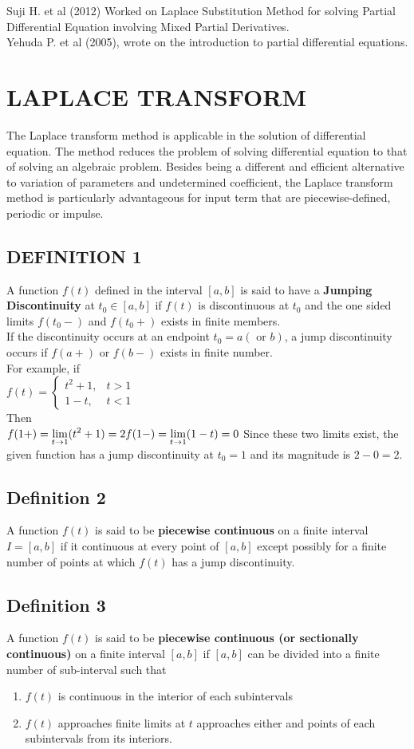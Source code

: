 \documentclass[11pt]{report}
\newcommand{\ft}{f(t)}
\newcommand{\sps}{\\[0.2cm]}
\newcommand{\bt}[1]{\textbf{#1}}
\newcommand{\dsp}{\displaystyle}
\begin{document}
	Suji H. et al (2012) Worked on Laplace Substitution Method for solving Partial Differential Equation involving Mixed Partial Derivatives.\\
	
	Yehuda P. et al (2005), wrote on the introduction to partial differential equations.    
	
	
	\section{LAPLACE TRANSFORM}
	The Laplace transform method is applicable in the solution of differential equation. The method reduces the problem of solving differential equation to that of solving an algebraic problem.  Besides being a different and efficient alternative to variation of parameters and undetermined coefficient, the Laplace transform method is particularly advantageous for input term that are piecewise-defined, periodic or impulse.
	
	\subsection{DEFINITION 1}
	A function $\ft$ defined in the interval $[a,b]$ is said to have a \bt{Jumping Discontinuity} at $t_0\in [a,b]$ if $\ft$ is discontinuous at $t_0$ and the one sided limits $f(t_0-)$ and $f(t_0+)$ exists in finite members.\sps
	If the discontinuity occurs at an endpoint $t_0=a(\text{ or } b)$, a jump discontinuity occurs if $f(a+)$ or $f(b-)$ exists in finite number.\sps
	For example, if\\
	$\dsp f(t) = \left\{ \begin{array}{lr}
		t^2 + 1, & t>1\\
		1-t, & t<1
	\end{array} \right.
	$\sps
	Then \sps
	$\dsp
		f(1+) = \lim\limits_{t\rightarrow 1}(t^2+1) = 2\sps
		f(1-) = \lim\limits_{t\rightarrow 1}(1-t) = 0\sps
	$
	Since these two limits exist, the given function has a jump discontinuity at $t_0=1$ and its magnitude is $2-0=2$.
	
	\subsection{Definition 2}
	A function $\ft$ is said to be \bt{piecewise continuous} on a finite interval $I=[a,b]$ if it continuous at every point of $[a,b]$ except possibly for a finite number of points at which $\ft$ has a jump discontinuity.
	
	\subsection{Definition 3}
	\label{sec:2_2_3}
	A function $\ft$ is said to be \bt{piecewise continuous (or sectionally continuous)} on a finite interval $[a,b]$ if $[a,b]$ can be divided into a finite number of sub-interval such that 
	\begin{enumerate}
		\item $\ft$ is continuous in the interior of each subintervals
		\item $\ft$ approaches finite limits at $t$ approaches either and points of each subintervals from its interiors.
	\end{enumerate}	
	
\end{document}
